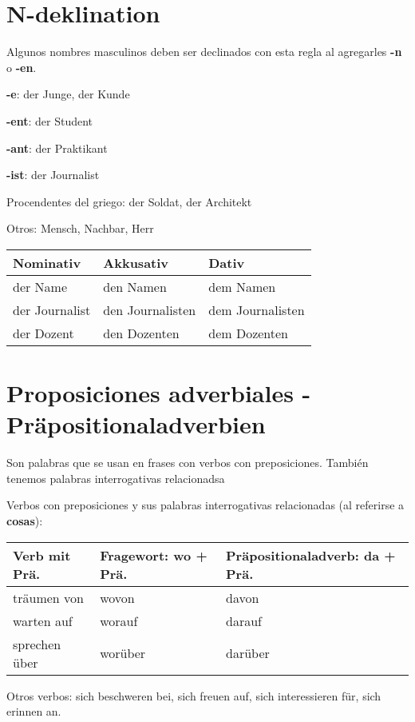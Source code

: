 \section{N-deklination}

Algunos nombres masculinos deben ser declinados con esta regla al agregarles \textbf{-n} o \textbf{-en}.
\begin{myitemize}
\item \textbf{-e}: der Junge, der Kunde
\item \textbf{-ent}: der Student
\item \textbf{-ant}: der Praktikant
\item \textbf{-ist}: der Journalist
\item Procendentes del griego: der Soldat, der Architekt
\item Otros: Mensch, Nachbar, Herr
\end{myitemize}

\begin{tabular}{| l | l | l |}
\hline
\textbf{Nominativ} & \textbf{Akkusativ} & \textbf{Dativ}\\
\hline
der Name & den Namen & dem Namen \\
der Journalist & den Journalisten & dem Journalisten \\
der Dozent & den Dozenten & dem Dozenten \\
\hline
\end{tabular}

\section{Proposiciones adverbiales - Präpositionaladverbien}
Son palabras que se usan en frases con verbos con preposiciones. También tenemos palabras interrogativas relacionadsa

Verbos con preposiciones y sus palabras interrogativas relacionadas (al referirse a \textbf{cosas}):

\begin{tabular}{| l | l | l |}
\hline
\textbf{Verb mit Prä.} & \textbf{Fragewort: wo + Prä.} & \textbf{Präpositionaladverb: da + Prä.}\\
\hline
träumen von & wovon & davon \\
warten auf & worauf & darauf \\
sprechen über & worüber & darüber\\
\hline
\end{tabular}

Otros verbos: sich beschweren bei, sich freuen auf, sich interessieren für, sich erinnen an.

